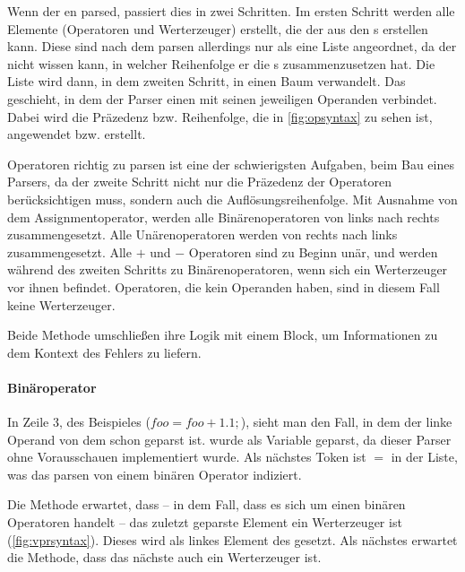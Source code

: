 {{      Wenn der  en parsed, passiert dies in zwei Schritten. Im ersten Schritt werden alle  Elemente (Operatoren und Werterzeuger) erstellt, die der  aus den s erstellen kann. Diese sind nach dem parsen allerdings nur als eine Liste angeordnet, da der  nicht wissen kann, in welcher Reihenfolge er die s zusammenzusetzen hat. Die Liste wird dann, in dem zweiten Schritt, in einen Baum verwandelt. Das geschieht, in dem der Parser einen  mit seinen jeweiligen Operanden verbindet. Dabei wird die Präzedenz bzw. Reihenfolge, die in \autoref{fig:opsyntax} zu sehen ist, angewendet bzw. erstellt.

      Operatoren richtig zu parsen ist eine der schwierigsten Aufgaben, beim Bau eines Parsers, da der zweite Schritt nicht nur die Präzedenz der Operatoren berücksichtigen muss, sondern auch die Auflösungsreihenfolge. Mit Ausnahme von dem Assignmentoperator, werden alle Binärenoperatoren von links nach rechts zusammengesetzt. Alle Unärenoperatoren werden von rechts nach links zusammengesetzt. Alle \myMIn$+$ und \myMIn$-$ Operatoren sind zu Beginn unär, und werden während des zweiten Schritts zu Binärenoperatoren, wenn sich ein Werterzeuger vor ihnen befindet. Operatoren, die kein Operanden haben, sind in diesem Fall keine Werterzeuger.

      Beide Methode umschließen ihre Logik mit einem  Block, um Informationen zu dem Kontext des Fehlers zu liefern.

      \paragraph{Binäroperator}
        In Zeile 3, des Beispieles (\myMIn$foo = foo + 1.1;$), sieht man den Fall, in dem der linke Operand von dem  schon geparst ist.  wurde als Variable geparst, da dieser Parser ohne Vorausschauen implementiert wurde. Als nächstes Token ist \myTIn$=$ in der Liste, was das parsen von einem binären Operator indiziert.

        Die  Methode erwartet, dass -- in dem Fall, dass es sich um einen binären Operatoren handelt -- das zuletzt geparste Element ein Werterzeuger ist (\autoref{fig:vprsyntax}). Dieses wird als linkes Element des  gesetzt. Als nächstes erwartet die Methode, dass das nächste  auch ein Werterzeuger ist.

}}
